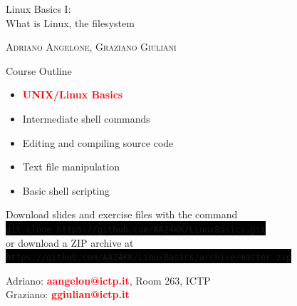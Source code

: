\documentclass[unknownkeysallowed, 10pt, a4 paper, handout]{beamer}
\newcommand{\focus}[1]{\textbf{\textcolor{red}{#1}}}
\newcommand{\code}[1]{\colorbox{black}{\color{green}\texttt{#1}}}
\begin{document}
\begin{frame}
  \begin{center}


    \begin{block}{}
      \Large
      \centering
      Linux Basics I:\\
      What is Linux, the filesystem
    \end{block}

    \vspace{6mm}
    \large
    \textsc{Adriano Angelone, Graziano Giuliani} \\

  \end{center}
\end{frame}


\begin{frame}[label=outline]{Course Outline}
  \begin{itemize}
    \item \focus{UNIX/Linux Basics}
    \item Intermediate shell commands
    \item Editing and compiling source code
    \item Text file manipulation
    \item Basic shell scripting
  \end{itemize}

  \vspace{6mm}

  \centering
  Download slides and exercise files with the command\\
  \code{git clone https://github.com/AA24KK/LinuxBasics.git}\\
  \vspace{1mm}
  or download a ZIP archive at
  \vspace{1mm}
  \code{https://github.com/AA24KK/LinuxBasics/archive/master.zip}

  \vspace{2mm}

  Adriano: \focus{aangelon@ictp.it}, Room 263, ICTP\\
  Graziano: \focus{ggiulian@ictp.it}

\end{frame}
\end{document}
